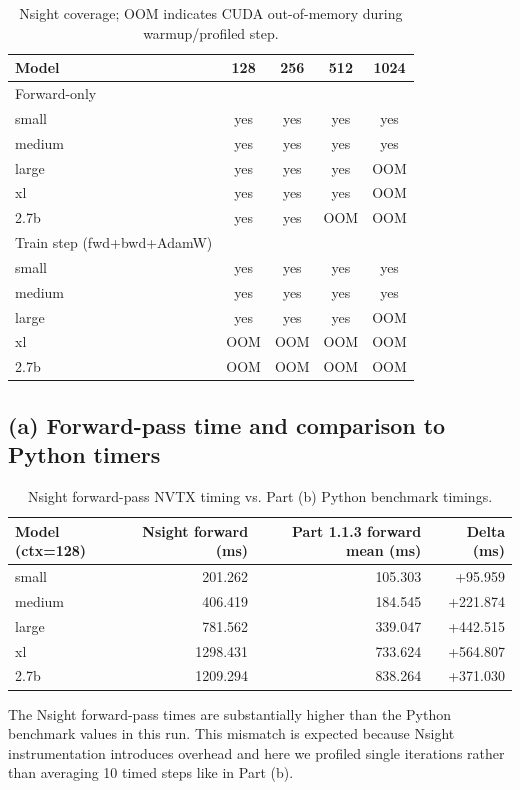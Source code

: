 \documentclass[11pt]{article}
\begin{document}
\begin{table}[h]
\centering
\begin{tabular}{lcccc}
\toprule
Model & 128 & 256 & 512 & 1024 \\
\midrule
Forward-only & & & & \\
small & yes & yes & yes & yes \\
medium & yes & yes & yes & yes \\
large & yes & yes & yes & OOM \\
xl & yes & yes & yes & OOM \\
2.7b & yes & yes & OOM & OOM \\
\midrule
Train step (fwd+bwd+AdamW) & & & & \\
small & yes & yes & yes & yes \\
medium & yes & yes & yes & yes \\
large & yes & yes & yes & OOM \\
xl & OOM & OOM & OOM & OOM \\
2.7b & OOM & OOM & OOM & OOM \\
\bottomrule
\end{tabular}
\caption{Nsight coverage; OOM indicates CUDA out-of-memory during warmup/profiled step.}
\end{table}

\subsection*{(a) Forward-pass time and comparison to Python timers}
\begin{table}[h]
\centering
\begin{tabular}{lrrr}
\toprule
Model (ctx=128) & Nsight forward (ms) & Part 1.1.3 forward mean (ms) & Delta (ms) \\
\midrule
small & 201.262 & 105.303 & +95.959 \\
medium & 406.419 & 184.545 & +221.874 \\
large & 781.562 & 339.047 & +442.515 \\
xl & 1298.431 & 733.624 & +564.807 \\
2.7b & 1209.294 & 838.264 & +371.030 \\
\bottomrule
\end{tabular}
\caption{Nsight forward-pass NVTX timing vs. Part (b) Python benchmark timings.}
\end{table}

The Nsight forward-pass times are substantially higher than the Python benchmark values in this run. This mismatch is expected because Nsight instrumentation introduces overhead and here we profiled single iterations rather than averaging 10 timed steps like in Part (b).
\end{document}
